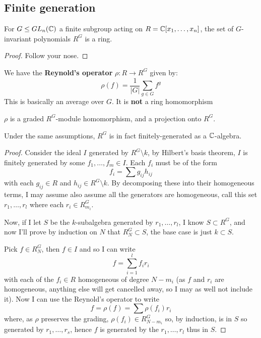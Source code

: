 \documentclass{article}
\begin{document}
\subsection{Finite generation}

\begin{proposition}
    For $G\leq GL_n(\mathbb{C})$ a finite subgroup acting on $R=\mathbb{C}[x_1,\ldots,x_n]$, the set of $G$-invariant polynomials $R^G$ is a ring.
    \begin{proof}
        Follow your nose.
    \end{proof}
\end{proposition}

\begin{definition}
    We have the \textbf{Reynold's operator} $\rho:R\rightarrow R^G$ given by: \[
    \rho(f) = \frac{1}{|G|}\sum_{g\in G}f^g
    \]
    This is basically an average over $G$. It is \textbf{not} a ring homomorphism
\end{definition}

\begin{lemma}
    $\rho$ is a graded $R^G$-module homomorphism, and a projection onto $R^G$.
\end{lemma}

\begin{theorem}
    Under the same assumptions, $R^G$ is in fact finitely-generated as a $\mathbb{C}$-algebra.
    \begin{proof}
        Consider the ideal $I$ generated by $R^G\setminus k$, by Hilbert's basis theorem, $I$ is finitely generated by some $f_1,\ldots,f_m\in I$. Each $f_i$ must be of the form \[
            f_i = \sum g_{ij}h_{ij}
        \] with each $g_{ij}\in R$ and $h_{ij}\in R^G\setminus k$.  By decomposing these into their homogeneous terms, I may assume also assume all the generators are homogeneous, call this set $r_1,\ldots,r_l$ where each $r_i\in R^G_{m_i}$.

        Now, if I let $S$ be the $k$-subalgebra generated by $r_1,\ldots,r_l$, I know $S \subset R^G$, and now I'll prove by induction on $N$ that $R_N^G\subset S$, the base case is just $k\subset S$.

        Pick $f\in R^G_N$, then $f\in I$ and so I can write \[
        f = \sum_{i=1}^l f_ir_i
        \] with each of the $f_i\in R$ homogeneous of degree $N-m_i$ (as $f$ and $r_i$ are homogeneous, anything else will get cancelled away, so I may as well not include it). Now I can use the Reynold's operator to write \[
        f = \rho(f) = \sum\rho(f_i)r_i
        \] where, as $\rho$ preserves the grading, $\rho(f_i)\in R^G_{N-m_i}$ so, by induction, is in $S$ so generated by $r_1,\ldots,r_s$, hence $f$ is generated by the $r_1,\ldots, r_l$ thus in $S$.
    \end{proof}
\end{theorem}
\end{document}
